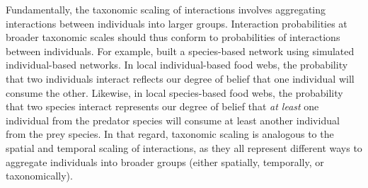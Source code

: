 \begin{box2.4}
Fundamentally, the taxonomic scaling of interactions involves aggregating
interactions between individuals into larger groups. Interaction probabilities
at broader taxonomic scales should thus conform to probabilities of interactions
between individuals. For example, \cite{Canard2012Emergence} built a
species-based network using simulated individual-based networks. In local
individual-based food webs, the probability that two individuals interact
reflects our degree of belief that one individual will consume the other.
Likewise, in local species-based food webs, the probability that two species
interact represents our degree of belief that \textit{at least} one individual
from the predator species will consume at least another individual from the prey
species. In that regard, taxonomic scaling is analogous to the spatial and
temporal scaling of interactions, as they all represent different ways to
aggregate individuals into broader groups (either spatially, temporally, or
taxonomically).

\end{box2.4}



